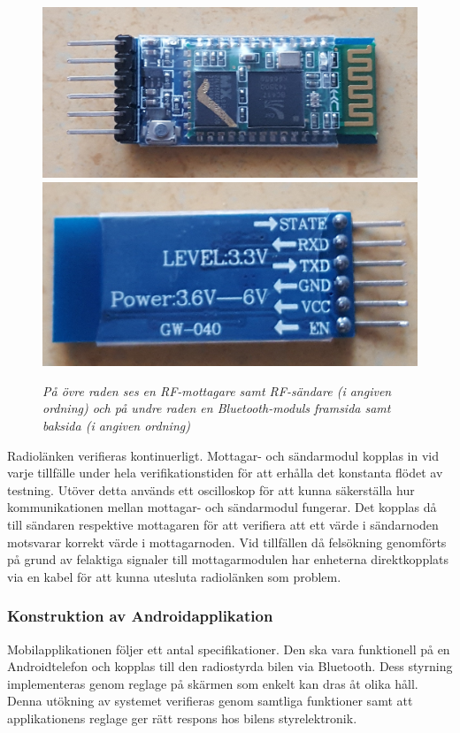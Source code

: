\documentclass[a4paper]{article}
\begin{document}
\begin{figure}[H]
\includegraphics[scale=0.06]{BluetoothFront.jpg}
\includegraphics[scale=0.066]{BluetoothBack.jpg}
\caption{\it På övre raden ses en RF-mottagare samt RF-sändare (i angiven ordning) och på undre raden en Bluetooth-moduls framsida samt baksida (i angiven ordning)}
\end{figure} 

\vspace{5mm} \noindent
Radiolänken verifieras kontinuerligt. Mottagar- och sändarmodul kopplas in vid varje tillfälle under hela verifikationstiden för att erhålla det konstanta flödet av testning. Utöver detta används ett oscilloskop för att kunna säkerställa hur kommunikationen mellan mottagar- och sändarmodul fungerar. Det kopplas då till sändaren respektive mottagaren för att verifiera att ett värde i sändarnoden motsvarar korrekt värde i mottagarnoden. Vid tillfällen då felsökning genomförts på grund av felaktiga signaler till mottagarmodulen har enheterna direktkopplats via en kabel för att kunna utesluta radiolänken som problem.


\subsubsection{Konstruktion av Androidapplikation}
Mobilapplikationen följer ett antal specifikationer. Den ska vara funktionell på en Androidtelefon och kopplas till den radiostyrda bilen via Bluetooth. Dess styrning implementeras genom reglage på skärmen som enkelt kan dras åt olika håll. Denna utökning av systemet verifieras genom samtliga funktioner samt att applikationens reglage ger rätt respons hos bilens styrelektronik. 
\end{document}
